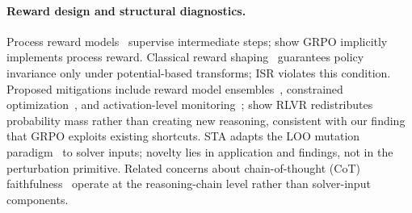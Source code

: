 \paragraph{Reward design and structural diagnostics.}
Process reward models~\citep{lightman-verify-step, setlur2025rewarding, cui2025prime, cobbe2021training, uesato2022solving} supervise intermediate steps; \citet{sullivan2025grpo-prm} show GRPO implicitly implements process reward.
Classical reward shaping~\citep{ng1999policy, gao-effective-rl-reward} guarantees policy invariance only under potential-based transforms; ISR violates this condition.
Proposed mitigations include reward model ensembles~\citep{coste2023reward}, constrained optimization~\citep{moskovitz2023confronting}, and activation-level monitoring~\citep{wilhelm2026monitoring}; \citet{yue2025rl-reasoning} show RLVR redistributes probability mass rather than creating new reasoning, consistent with our finding that GRPO exploits existing shortcuts.
STA adapts the LOO mutation paradigm~\citep{demillo1978, jia-harman-survey} to solver inputs; novelty lies in application and findings, not in the perturbation primitive.
Related concerns about chain-of-thought (CoT) faithfulness~\citep{lanham2023faithfulness, turpin2023unfaithful} operate at the reasoning-chain level rather than solver-input components.
